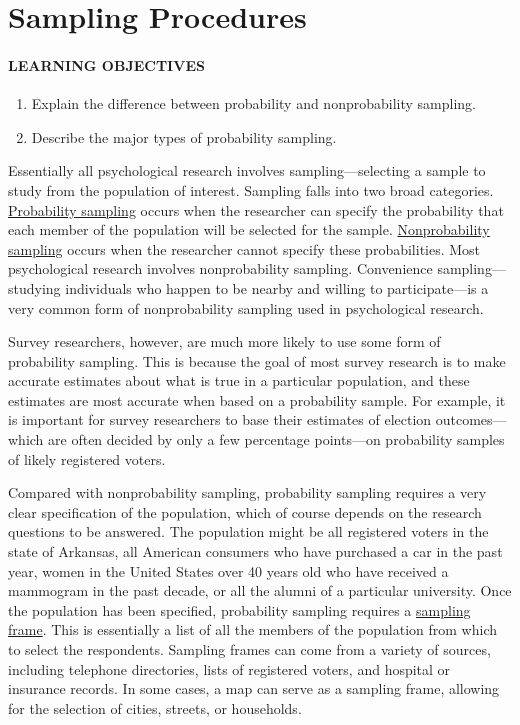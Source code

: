 \documentclass[
]{krantz}
\providecommand{\tightlist}{%
  \setlength{\itemsep}{0pt}\setlength{\parskip}{0pt}}
\begin{document}
\hypertarget{sampling-procedures}{%
\section{Sampling Procedures}\label{sampling-procedures}}

\hypertarget{learning-objectives-18}{%
\paragraph*{LEARNING OBJECTIVES}\label{learning-objectives-18}}

\begin{enumerate}
\def\labelenumi{\arabic{enumi}.}
\tightlist
\item
  Explain the difference between probability and nonprobability sampling.
\item
  Describe the major types of probability sampling.
\end{enumerate}

Essentially all psychological research involves sampling---selecting a sample to study from the population of interest. Sampling falls into two broad categories. \protect\hyperlink{probability-sampling}{Probability sampling} occurs when the researcher can specify the probability that each member of the population will be selected for the sample. \protect\hyperlink{nonprobability-sampling}{Nonprobability sampling} occurs when the researcher cannot specify these probabilities. Most psychological research involves nonprobability sampling. Convenience sampling---studying individuals who happen to be nearby and willing to participate---is a very common form of nonprobability sampling used in psychological research.

Survey researchers, however, are much more likely to use some form of probability sampling. This is because the goal of most survey research is to make accurate estimates about what is true in a particular population, and these estimates are most accurate when based on a probability sample. For example, it is important for survey researchers to base their estimates of election outcomes---which are often decided by only a few percentage points---on probability samples of likely registered voters.

Compared with nonprobability sampling, probability sampling requires a very clear specification of the population, which of course depends on the research questions to be answered. The population might be all registered voters in the state of Arkansas, all American consumers who have purchased a car in the past year, women in the United States over 40 years old who have received a mammogram in the past decade, or all the alumni of a particular university. Once the population has been specified, probability sampling requires a \protect\hyperlink{sampling-frame}{sampling frame}. This is essentially a list of all the members of the population from which to select the respondents. Sampling frames can come from a variety of sources, including telephone directories, lists of registered voters, and hospital or insurance records. In some cases, a map can serve as a sampling frame, allowing for the selection of cities, streets, or households.
\end{document}
